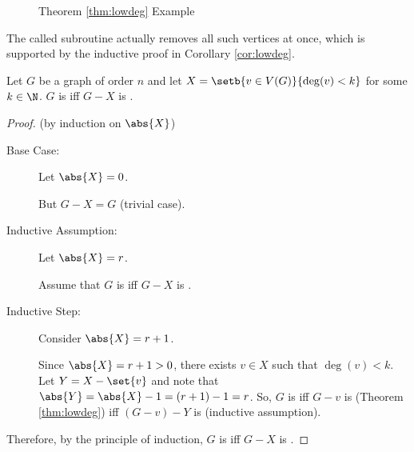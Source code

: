 \begin{figure}[h]
  \label{fig:lowdeg}
  \begin{center}
  \end{center}
  \caption{Theorem \ref{thm:lowdeg} Example}
\end{figure}

The called subroutine actually removes all such vertices at once, which is supported by the inductive proof in
Corollary \ref{cor:lowdeg}.

\begin{corollary}
  \label{cor:lowdeg}
  Let \(G\) be a graph of order \(n\) and let \(X=\setb{v\in V(G)}{\deg(v)<k}\) for some \(k\in\N\).  \(G\) is
   iff \(G-X\) is .
\end{corollary}

\begin{proof}
  (by induction on \(\abs{X}\))
  \begin{description}
  \item[Base Case:] Let \(\abs{X}=0\).

    But \(G-X=G\) (trivial case).

  \item[Inductive Assumption:] Let \(\abs{X}=r\).

    Assume that \(G\) is  iff \(G-X\) is .

  \item[Inductive Step:] Consider \(\abs{X}=r+1\).
    
    Since \(\abs{X}=r+1>0\), there exists \(v\in X\) such that \(\deg(v)<k\).  Let \(Y=X-\set{v}\) and note that
    \(\abs{Y}=\abs{X}-1=(r+1)-1=r\).  So, \(G\) is  iff \(G-v\) is  (Theorem
    \ref{thm:lowdeg}) iff \((G-v)-Y\) is  (inductive assumption).
  \end{description}

  Therefore, by the principle of induction, \(G\) is  iff \(G-X\) is .
\end{proof}

